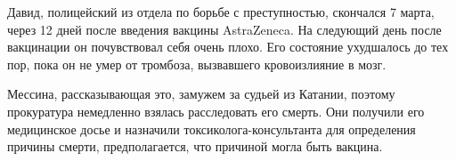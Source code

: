 Давид, полицейский из отдела по борьбе с преступностью, скончался 7 марта, через
12 дней после введения вакцины AstraZeneca. На следующий день после вакцинации
он почувствовал себя очень плохо. Его состояние ухудшалось до тех пор, пока он
не умер от тромбоза, вызвавшего кровоизлияние в мозг.

Мессина, рассказывающая это, замужем за судьей из Катании, поэтому прокуратура
немедленно взялась расследовать его смерть. Они получили его медицинское досье и
назначили токсиколога-консультанта для определения причины смерти,
предполагается, что причиной могла быть вакцина.
